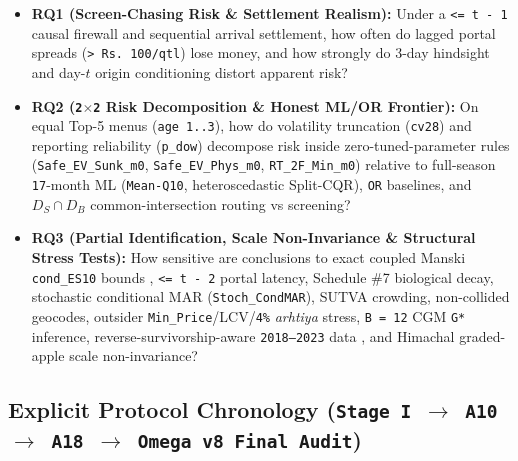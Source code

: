 \documentclass[11pt,a4paper]{article}
\begin{document}
\begin{itemize}
  \item \textbf{RQ1 (Screen-Chasing Risk \& Settlement Realism):} Under a \texttt{<= t - 1} causal firewall and sequential arrival settlement, how often do lagged portal spreads (\texttt{> Rs.\,100/qtl}) lose money, and how strongly do 3-day hindsight and day-$t$ origin conditioning distort apparent risk?
  \item \textbf{RQ2 (\texttt{2$\times$2} Risk Decomposition \& Honest ML/OR Frontier):} On equal Top-5 menus (\texttt{age 1..3}), how do volatility truncation (\texttt{cv28}) and reporting reliability (\texttt{p\_dow}) decompose risk inside zero-tuned-parameter rules (\texttt{Safe\_EV\_Sunk\_m0}, \texttt{Safe\_EV\_Phys\_m0}, \texttt{RT\_2F\_Min\_m0}) relative to full-season \texttt{17}-month ML (\texttt{Mean-Q10}, heteroscedastic Split-CQR), \texttt{OR} baselines, and $D_S \cap D_B$ common-intersection routing vs screening?
  \item \textbf{RQ3 (Partial Identification, Scale Non-Invariance \& Structural Stress Tests):} How sensitive are conclusions to exact coupled Manski \texttt{cond\_ES10} bounds \citep{manski1990bounds,rubin1976inference}, \texttt{<= t - 2} portal latency, Schedule \#7 biological decay, stochastic conditional MAR (\texttt{Stoch\_CondMAR}), SUTVA crowding, non-collided geocodes, outsider \texttt{Min\_Price}/LCV/\texttt{4\%} \textit{arhtiya} stress, \texttt{B = 12} CGM \texttt{G*} inference, reverse-survivorship-aware \texttt{2018--2023} data \citep{sparks2018nasapower}, and Himachal graded-apple scale non-invariance?
\end{itemize}

\subsection{Explicit Protocol Chronology (\texttt{Stage I $\to$ A10 $\to$ A18 $\to$ Omega v8 Final Audit})}
\end{document}
